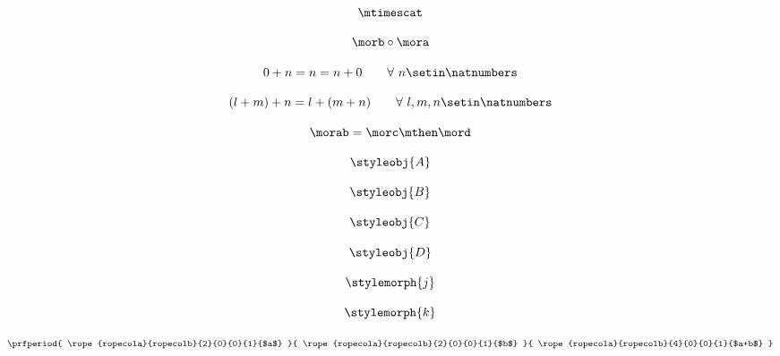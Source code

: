 \begin{forslides}
        \begin{equation}
            \label{eq:42}
            \mtimescat
        \end{equation}

        \begin{equation}
            \label{eq:43}
            \morb \circ \mora
        \end{equation}

        \begin{equation}
            \label{eq:44}
            0 + n = n = n + 0   \quad \quad \forall \ n \setin \natnumbers
        \end{equation}

        \begin{equation}
            \label{eq:45}
            (l + m) + n = l + (m + n) \quad \quad  \forall \ l, m, n \setin \natnumbers
        \end{equation}

        \begin{equation}
            \label{eq:46}
            \morab = \morc \mthen \mord
        \end{equation}

        \begin{equation}
            \label{eq:47}
            \styleobj{A}
        \end{equation}

        \begin{equation}
            \label{eq:48}
            \styleobj{B}
        \end{equation}

        \begin{equation}
            \label{eq:49}
            \styleobj{C}
        \end{equation}

        \begin{equation}
            \label{eq:50}
            \styleobj{D}
        \end{equation}

        \begin{equation}
            \label{eq:51}
            \stylemorph{j}
        \end{equation}

        \begin{equation}
            \label{eq:52}
            \stylemorph{k}
        \end{equation}
        
        \begin{equation}
            \label{eq:53}
                \prfperiod{
        \rope{ropecola}{ropecolb}{2}{0}{0}{1}{$a$}
    }{
        \rope{ropecola}{ropecolb}{2}{0}{0}{1}{$b$}
    }{
        \rope{ropecola}{ropecolb}{4}{0}{0}{1}{$a+b$}
    }
        \end{equation}
        

\end{forslides}
